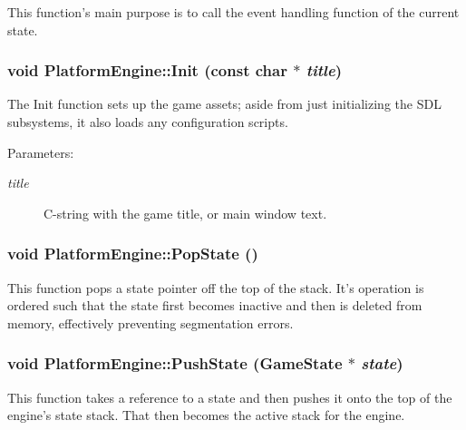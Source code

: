 This function's main purpose is to call the event handling function of the current state. \hypertarget{class_platform_engine_31d40c1f435565850964c6e9f212baa5}{
\subsubsection[{Init}]{\setlength{\rightskip}{0pt plus 5cm}void PlatformEngine::Init (const char $\ast$ {\em title})}}
\label{class_platform_engine_31d40c1f435565850964c6e9f212baa5}


The Init function sets up the game assets; aside from just initializing the SDL subsystems, it also loads any configuration scripts.

\begin{Desc}
\item[Parameters:]
\begin{description}
\item[{\em title}]C-string with the game title, or main window text. \end{description}
\end{Desc}
\hypertarget{class_platform_engine_cf001abec596906465197d1220db2230}{
\subsubsection[{PopState}]{\setlength{\rightskip}{0pt plus 5cm}void PlatformEngine::PopState ()}}
\label{class_platform_engine_cf001abec596906465197d1220db2230}


This function pops a state pointer off the top of the stack. It's operation is ordered such that the state first becomes inactive and then is deleted from memory, effectively preventing segmentation errors. \hypertarget{class_platform_engine_98e3d34b6ee831bcc1d26bac83bfe8d8}{
\subsubsection[{PushState}]{\setlength{\rightskip}{0pt plus 5cm}void PlatformEngine::PushState ({\bf GameState} $\ast$ {\em state})}}
\label{class_platform_engine_98e3d34b6ee831bcc1d26bac83bfe8d8}


This function takes a reference to a state and then pushes it onto the top of the engine's state stack. That then becomes the active stack for the engine.

